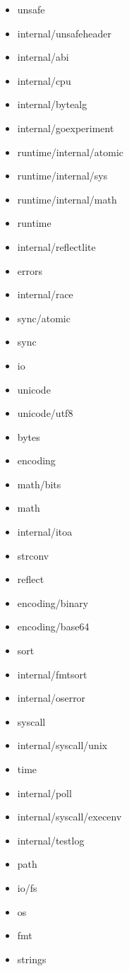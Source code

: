 \begin{itemize}
    \item unsafe
    \item internal/unsafeheader
    \item internal/abi
    \item internal/cpu
    \item internal/bytealg
    \item internal/goexperiment
    \item runtime/internal/atomic
    \item runtime/internal/sys
    \item runtime/internal/math
    \item runtime
    \item internal/reflectlite
    \item errors
    \item internal/race
    \item sync/atomic
    \item sync
    \item io
    \item unicode
    \item unicode/utf8
    \item bytes
    \item encoding
    \item math/bits
    \item math
    \item internal/itoa
    \item strconv
    \item reflect
    \item encoding/binary
    \item encoding/base64
    \item sort
    \item internal/fmtsort
    \item internal/oserror
    \item syscall
    \item internal/syscall/unix
    \item time
    \item internal/poll
    \item internal/syscall/execenv
    \item internal/testlog
    \item path
    \item io/fs
    \item os
    \item fmt
    \item strings

\end{itemize}

